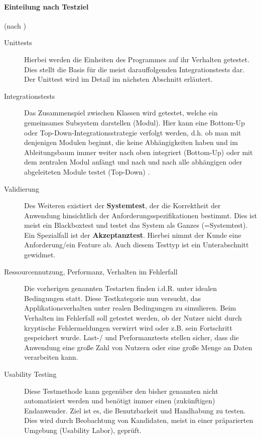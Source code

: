 \paragraph{Einteilung nach Testziel} (nach \citep[S. 238ff]{hunt_pragmatic_1999}) \nolinebreak
\begin{description}
 \item[Unittests] Hierbei werden die Einheiten des Programmes auf ihr Verhalten getestet. Dies stellt die Basis für die meist darauffolgenden Integrationstests dar. Der Unittest wird im Detail im nächsten Abschnitt erläutert.
 \item[Integrationstests] Das Zusammenspiel zwischen Klassen wird getestet, welche ein gemeinsames Subsystem darstellen (Modul). Hier kann eine Bottom-Up oder Top-Down\hyp{}Integrationsstrategie verfolgt werden, d.h. ob man mit denjenigen Modulen beginnt, die keine Abhängigkeiten haben und im Ableitungsbaum immer weiter nach oben integriert (Bottom-Up) oder mit dem zentralen Modul anfängt und nach und nach alle abhängigen oder abgeleiteten Module testet (Top-Down) \citep{liggesmeyer_modultest_1990}.
 \item[Validierung] Des Weiteren existiert der \textbf{Systemtest}, der die Korrektheit der Anwendung hinsichtlich der Anforderungsspezifikationen bestimmt. Dies ist meist ein Blackboxtest und testet das System als Ganzes (=Systemtest). Ein Spezialfall ist der \textbf{Akzeptanztest}. Hierbei nimmt der Kunde eine Anforderung/ein Feature ab. Auch diesem Testtyp ist ein Unterabschnitt gewidmet.
 \item[Ressourcennutzung, Performanz, Verhalten im Fehlerfall] Die vorherigen genannten Testarten finden i.d.R. unter idealen Bedingungen statt. Diese Testkategorie nun versucht, das Applikationsverhalten unter realen Bedingungen zu simulieren. Beim Verhalten im Fehlerfall soll getestet werden, ob der Nutzer nicht durch kryptische Fehlermeldungen verwirrt wird oder z.B. sein Fortschritt gespeichert wurde. Last-/ und Performanztests stellen sicher, dass die Anwendung eine große Zahl von Nutzern oder eine große Menge an Daten verarbeiten kann.
 \item[Usability Testing] Diese Testmethode kann gegenüber den bisher genannten nicht automatisiert werden und benötigt immer einen (zukünftigen) Endanwender. Ziel ist es, die Benutzbarkeit und Handhabung zu testen. Dies wird durch Beobachtung von Kandidaten, meist in einer präparierten Umgebung (Usability Labor), geprüft.
\end{description}

